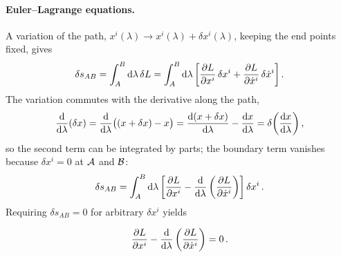 \paragraph{Euler--Lagrange equations.}
A variation of the path, $x^i(\lambda) \to x^i(\lambda) + \delta x^i(\lambda)$, keeping the end
points fixed, gives
\begin{equation}
    \delta s_{AB} = \int_A^B \mathrm{d}\lambda\, \delta L
    = \int_A^B \mathrm{d}\lambda \left[ \frac{\partial L}{\partial x^i}\, \delta x^i + \frac{\partial L}{\partial \dot{x}^i}\, \delta\dot{x}^i \right] .
\end{equation}
The variation commutes with the derivative along the path,
\begin{equation}
    \frac{\mathrm{d} }{\mathrm{d} \lambda} (\delta x) = \frac{\mathrm{d} }{\mathrm{d} \lambda} \bigl( (x + \delta x) - x \bigr)
    = \frac{\mathrm{d} (x + \delta x)}{\mathrm{d} \lambda} - \frac{\mathrm{d} x}{\mathrm{d} \lambda} = \delta\!\left( \frac{\mathrm{d} x}{\mathrm{d} \lambda} \right) ,
\end{equation}
so the second term can be integrated by parts; the boundary term vanishes because
$\delta x^i = 0$ at $\mathcal{A}$ and $\mathcal{B}$:
\begin{equation}
    \delta s_{AB} = \int_A^B \mathrm{d}\lambda \left[ \frac{\partial L}{\partial x^i} - \frac{\mathrm{d} }{\mathrm{d} \lambda} \left( \frac{\partial L}{\partial \dot{x}^i} \right) \right] \delta x^i \, .
\end{equation}
Requiring $\delta s_{AB} = 0$ for arbitrary $\delta x^i$ yields
\begin{keyresult}
    \begin{equation}
        \frac{\partial L}{\partial x^i} - \frac{\mathrm{d} }{\mathrm{d} \lambda} \left( \frac{\partial L}{\partial \dot{x}^i} \right) = 0 \, .
        \label{eq:euler_lagrange}
    \end{equation}
\end{keyresult}

